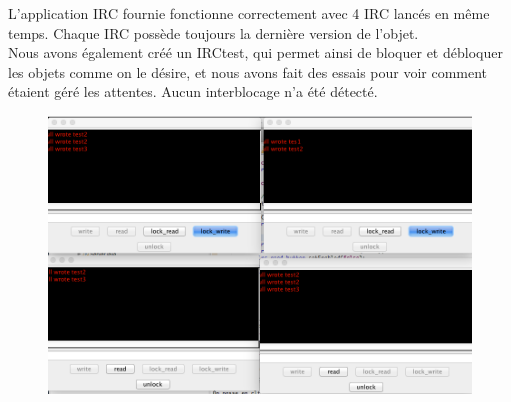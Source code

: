 \documentclass[11pt,a4paper]{report}
\begin{document}
L'application IRC fournie fonctionne correctement avec 4 IRC lancés en même temps. Chaque IRC possède toujours la dernière version de l'objet. \\
Nous avons également créé un IRCtest, qui permet ainsi de bloquer et débloquer les objets comme on le désire, et nous avons fait des essais pour voir comment étaient géré les attentes. Aucun interblocage n'a été détecté.
\begin{figure}[!h]
\begin{center}
\includegraphics[scale=0.5]{IRCtes.png}
\end{center}
\end{figure}
\end{document}
